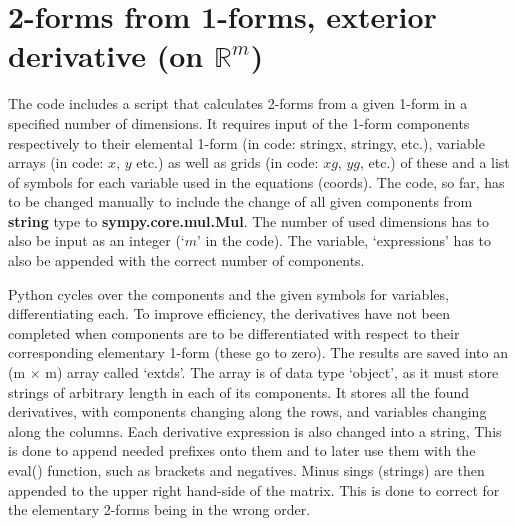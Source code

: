 \documentclass[11]{report}
\begin{document}
\section{2-forms from 1-forms, exterior derivative (on $\mathbb{R}^{m}$)}
The code includes a script that calculates 2-forms from a given 1-form in a specified number of dimensions.
It requires input of the 1-form components respectively to their elemental 1-form (in code: string\textunderscore x, string\textunderscore y, etc.), variable arrays (in code: $x$, $y$ etc.) as well as grids (in code: $xg$, $yg$, etc.) of these and a list of symbols for each variable used in the equations (coords).
The code, so far, has to be changed manually to include the change of all given components from \textbf{string} type to \textbf{sympy.core.mul.Mul}. The number of used dimensions has to also be input as an integer (`$m$' in the code). The variable, `expressions' has to also be appended with the correct number of components.

\noindent Python cycles over the components and the given symbols for variables, differentiating each. To improve efficiency, the derivatives have not been completed when components are to be differentiated with respect to their corresponding elementary 1-form (these go to zero). The results are saved into an (m $\times$ m) array called `ext\textunderscore ds'. The array is of data type `object', as it must store strings of arbitrary length in each of its components. It stores all the found derivatives, with components changing along the rows, and variables changing along the columns.
Each derivative expression is also changed into a string, This is done to append needed prefixes onto them and to later use them with the eval() function, such as brackets and negatives. Minus sings (strings) are then appended to the upper right hand-side of the matrix. This is done to correct for the elementary 2-forms being in the wrong order.
\end{document}
